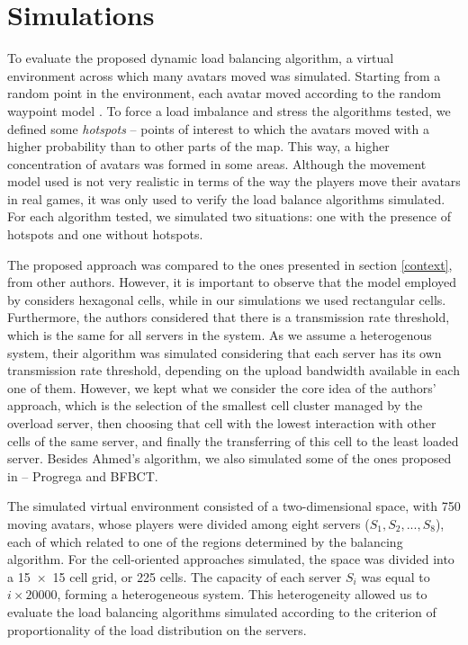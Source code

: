 \documentclass[acmjacm]{acmtrans2m}
\begin{document}
\section{Simulations}
\label{sec:simul}

To evaluate the proposed dynamic load balancing algorithm, a virtual environment across which many avatars moved was simulated. Starting from a random point in the environment, each avatar moved according to the random waypoint model \cite{bettstetter2004spr}. To force a load imbalance and stress the algorithms tested, we defined some \emph{hotspots} -- points of interest to which the avatars moved with a higher probability than to other parts of the map. This way, a higher concentration of avatars was formed in some areas. Although the movement model used is not very realistic in terms of the way the players move their avatars in real games, it was only used to verify the load balance algorithms simulated. For each algorithm tested, we simulated two situations: one with the presence of hotspots and one without hotspots.

The proposed approach was compared to the ones presented in section \ref{context}, from other authors. However, it is important to observe that the model employed by \cite{ahmed2008mol} considers hexagonal cells, while in our simulations we used rectangular cells. Furthermore, the authors considered that there is a transmission rate threshold, which is the same for all servers in the system. As we assume a heterogenous system, their algorithm was simulated considering that each server has its own transmission rate threshold, depending on the upload bandwidth available in each one of them. However, we kept what we consider the core idea of the authors' approach, which is the selection of the smallest cell cluster managed by the overload server, then choosing that cell with the lowest interaction with other cells of the same server, and finally the transferring of this cell to the least loaded server. Besides Ahmed's algorithm, we also simulated some of the ones proposed in \cite{bezerra2009lbs} -- Progrega and BFBCT.

The simulated virtual environment consisted of a two-dimensional space, with 750 moving avatars, whose players were divided among eight servers ($S_1, S_2, ..., S_8$), each of which related to one of the regions determined by the balancing algorithm. For the cell-oriented approaches simulated, the space was divided into a \mbox{15 $\times$ 15} cell grid, or 225 cells. The capacity of each server $S_i$ was equal to $i \times 20000$, forming a heterogeneous system. This heterogeneity allowed us to evaluate the load balancing algorithms simulated according to the criterion of proportionality of the load distribution on the servers.
\end{document}

